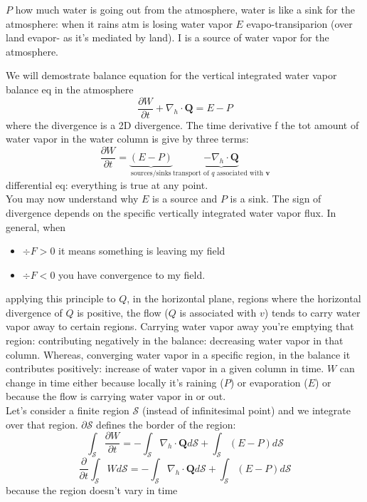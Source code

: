 $P$ how much water is going out from the atmosphere, water is like a sink for the atmosphere: when it rains atm is losing water vapor
$E$ evapo-transiparion (over land evapor- as it's mediated by land). I is a source of water vapor for the atmosphere. 

We will demostrate balance equation for the vertical integrated water vapor balance eq in the atmosphere
\begin{equation}\label{eq.W}
    \frac{\partial W}{\partial t}+\nabla_h\cdot \mathbf{Q}=E-P
\end{equation}
where the divergence is a 2D divergence. The time derivative f the tot amount of water vapor in the water column is give by three terms: 
\[\frac{\partial W}{\partial t}=\underbrace{(E-P)}_{\text{sources/sinks}}\underbrace{-\nabla_h\cdot \mathbf{Q}}_{\text{transport of $q$ associated with $\mathbf{v}$}}\]
differential eq: everything is true at any point.\\




You may now understand why $E$ is a source and $P$ is a sink. The sign of divergence depends on the specific vertically integrated water vapor flux. In general, when 
\begin{itemize}
    \item $\div{F}>0$ it means something is leaving my field
    \item $\div{F}<0$ you have convergence to my field.
\end{itemize}
applying this principle to $Q$, in the horizontal plane, regions where the horizontal divergence of $Q$ is positive, the flow ($Q$ is associated with $v$) tends to carry water vapor away to certain regions. Carrying water vapor away you're emptying that region: contributing negatively in the balance: decreasing water vapor in that column. Whereas, converging water vapor in a specific region, in the balance it contributes positively: increase of water vapor in a given column in time. $W$ can change in time either because locally it's raining ($P$) or evaporation ($E$) or because the flow is carrying water vapor in or out. \\


Let's consider a finite region $\mathcal{S}$ (instead of infinitesimal point) and we integrate over that region. $\partial\mathcal{S}$ defines the border of the region:
\[\int_{\mathcal{S}}\frac{\partial W}{\partial t}=-\int_{\mathcal{S}}\nabla_h\cdot\mathbf{Q}d\mathcal{S}+\int_{\mathcal{S}}(E-P)d\mathcal{S}\]
\[\frac{\partial}{\partial t}\int_{\mathcal{S}}Wd\mathcal{S}=-\int_{\mathcal{S}}\nabla_h\cdot\mathbf{Q}d\mathcal{S}+\int_{\mathcal{S}}(E-P)d\mathcal{S}\]
because the region doesn't vary in time


